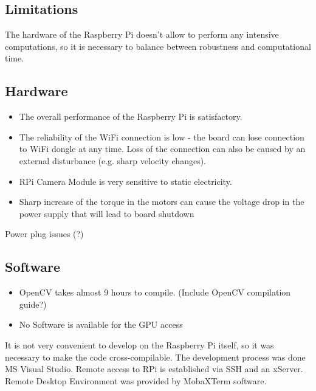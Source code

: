 \subsection{Limitations}

The hardware of the Raspberry Pi doesn't allow to perform any intensive
computations, so it is necessary to balance between robustness and
computational time.

\subsection{Hardware}

\begin{itemize}
  	\item The overall performance of the Raspberry Pi is satisfactory. 
  	\item The reliability of the WiFi connection is low - the board can lose
  connection to WiFi dongle at any time. Loss of the connection can also be caused by an
external disturbance (e.g. sharp velocity changes).
	\item RPi Camera Module is very sensitive to static electricity.
	\item Sharp increase of the torque in the motors can cause the voltage drop in
	the power supply that will lead to board shutdown
\end{itemize}

Power plug issues (?)

\subsection{Software}

\begin{itemize}
  \item OpenCV takes almost 9 hours to compile. (Include OpenCV compilation
  guide?)
  \item No Software is available for the GPU access
\end{itemize}

It is not very convenient to develop on the Raspberry Pi itself, so it was
necessary to make the code cross-compilable. The development process was done
MS Visual Studio. Remote access to RPi is established via SSH and an xServer.
Remote Desktop Environment was provided by MobaXTerm software.